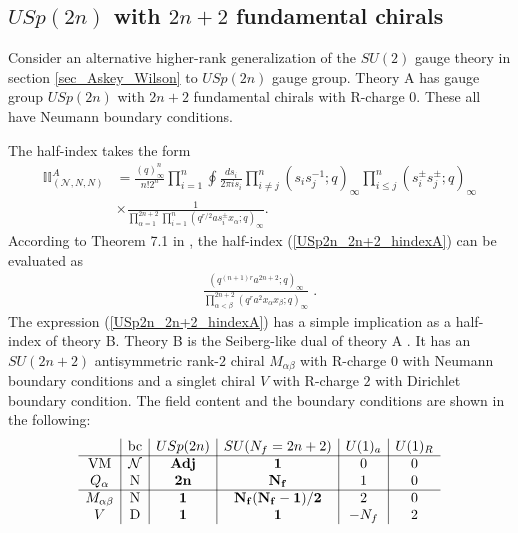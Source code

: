 \documentclass[12pt]{article}
\numberwithin{equation}{section}
\begin{document}
\subsection{$USp(2n)$ with $2n+2$ fundamental chirals}
\label{sec_USp2n_2np2_integrals}
Consider an alternative higher-rank generalization of the $SU(2)$ gauge theory in section \ref{sec_Askey_Wilson} to $USp(2n)$ gauge group. 
Theory A has gauge group $USp(2n)$ with $2n + 2$ fundamental chirals
with R-charge $0$. These all have Neumann boundary conditions.

The half-index takes the form
\begin{align}
\label{USp2n_2n+2_hindexA}
\mathbb{II}_{(\mathcal{N},N,N)}^A
&=\frac{(q)_{\infty}^n}{n! 2^n} \prod_{i=1}^n \oint \frac{ds_i}{2\pi i s_i}
\prod_{i \ne j}^n (s_i s_j^{-1}; q)_{\infty} \prod_{i \le j}^n (s_i^{\pm} s_j^{\pm}; q)_{\infty}
\nonumber\\
&\times 
\frac{1}{\prod_{\alpha = 1}^{2n + 2} \prod_{i = 1}^n (q^{r/2} a s_i^{\pm} x_{\alpha}; q)_{\infty}}. 
\end{align}
According to Theorem 7.1 in \cite{MR1139492}, 
the half-index (\ref{USp2n_2n+2_hindexA}) can be evaluated as
\begin{align}
\label{USp2n_2n+2_hindexB}
\frac{\left( q^{(n+1)r} a^{2n+2}; q \right)_{\infty}}{\prod_{\alpha < \beta}^{2n + 2} (q^r a^2 x_{\alpha} x_{\beta}; q)_{\infty}} \; .
\end{align}
The expression (\ref{USp2n_2n+2_hindexA}) has a simple implication as a half-index of theory B. 
Theory B  is the Seiberg-like dual of theory A \cite{Karch:1997ux}. It has an  $SU(2n + 2)$ antisymmetric rank-$2$ chiral $M_{\alpha\beta}$ with R-charge $0$
with Neumann boundary conditions and
a singlet chiral $V$ with R-charge $2$ with Dirichlet boundary condition. 
The field content and the boundary conditions are shown in the following: 
\begin{align}
\label{USp2n_2np2_charges}
\begin{array}{c|c|c|c|c|c}
& \textrm{bc} & USp(2n) & SU(N_f = 2n + 2) & U(1)_a & U(1)_R \\ \hline
\textrm{VM} & \mathcal{N} & {\bf Adj} & {\bf 1} & 0 & 0 \\
Q_{\alpha} & \textrm{N} & {\bf 2n} & {\bf N_f} & 1 & 0 \\
 \hline
M_{\alpha \beta} & \textrm{N} & {\bf 1} & {\bf N_f(N_f - 1)/2} & 2 & 0 \\
V & \textrm{D} & {\bf 1} & {\bf 1} & -N_f & 2
\end{array}
\end{align}
\end{document}
